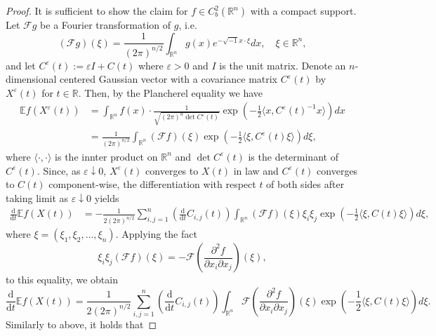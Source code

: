 \documentclass[11pt]{article}
\numberwithin{equation}{section}
\newcommand{\E}{\mathbb{E}}
\newcommand{\1}{\mathbf 1}
\begin{document}
\begin{proof}
It is sufficient to show the claim for $f\in C_b^2({\mathbb R}^n)$ with a compact support. 
Let ${\mathcal F}g$ be a Fourier transformation of $g$, i.e.
\[
({\mathcal F} g) (\xi ) = \frac{1}{(2\pi )^{n/2}}\int _{\mathbb R^n} g(x) e^{-\sqrt{-1}x\cdot \xi } dx, \quad \xi \in {\mathbb R}^n ,
\]
and let $C^\varepsilon (t) := \varepsilon I + C(t)$ where $\varepsilon >0$ and $I$ is the unit matrix.
Denote an $n$-dimensional centered Gaussian vector with a covariance matrix $C^\varepsilon (t)$ by $X^\varepsilon (t)$ for $t\in {\mathbb R}$.
Then, by the Plancherel equality we have
\begin{align*}
\E f(X^\varepsilon (t)) &= \int _{{\mathbb R}^n} f(x) \cdot \frac{1}{\sqrt{(2\pi)^n \det C^\varepsilon(t)}} \exp \left( -\frac{1}{2}\langle x , C^\varepsilon (t)^{-1} x \rangle \right) dx \\
%
&= \frac{1}{(2\pi )^{n/2}} \int _{{\mathbb R}^n} ({\mathcal F}f)(\xi ) \exp \left( -\frac{1}{2} \langle \xi , C^\varepsilon (t)\xi \rangle \right) d\xi,
\end{align*}
where $\langle \cdot ,\cdot \rangle$ is the innter product on ${\mathbb R}^n$ and $\det C^\varepsilon(t)$ is the determinant of $C^\varepsilon(t)$.
Since, as $\varepsilon \downarrow 0$, $X^\varepsilon (t)$ converges to $X(t)$ in law and $ C^\varepsilon (t)$ converges to $C(t)$ component-wise, the differentiation with respect $t$ of both sides after taking limit as $\varepsilon \downarrow 0$ yields
\begin{align*}
\frac{\mathrm d}{\mathrm dt} \E f(X(t)) &= - \frac{1}{2(2\pi )^{n/2}}\sum _{i,j =1}^n \left( \frac{\mathrm d}{\mathrm dt} C_{i,j}(t)\right) \int _{{\mathbb R}^n} ({\mathcal F}f)(\xi ) \xi _i \xi _j \exp \left( -\frac{1}{2} \langle \xi , C(t)\xi \rangle \right) d\xi,
\end{align*}
where $\xi = (\xi _1, \xi _2 ,\dots , \xi _n)$.
Applying the fact
\[
\xi _i \xi _j ({\mathcal F}f)(\xi ) = - {\mathcal F} \left( \frac{\partial ^2 f}{\partial x_i \partial x_j} \right)(\xi ) ,
\]
to this equality, we obtain
\begin{equation}\label{eq:Price01}
\frac{\mathrm d}{\mathrm dt} \E f(X(t)) = \frac{1}{2(2\pi )^{n/2}}\sum _{i,j =1}^n \left( \frac{\mathrm d}{\mathrm dt} C_{i,j}(t)\right) \int _{{\mathbb R}^n} {\mathcal F} \left( \frac{\partial ^2 f}{\partial x_i \partial x_j} \right)(\xi ) \exp \left( -\frac{1}{2} \langle \xi , C(t)\xi \rangle \right) d\xi .
\end{equation}
Similarly to above, it holds that

\end{proof}
\end{document}
